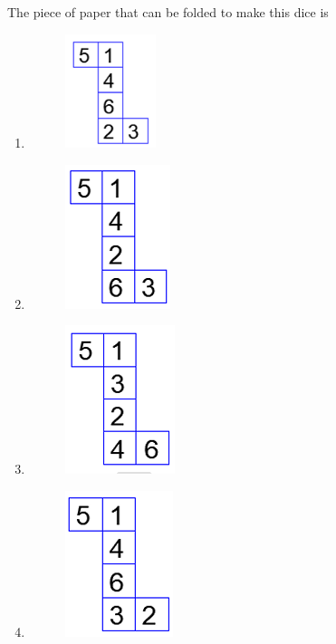 \documentclass[journal]{IEEEtran}
\begin{document}
\begin{enumerate}
The piece of paper that can be folded to make this dice is

\hfill{}
\begin{enumerate}

\item 
\begin{figure}[H]
    \centering
    \includegraphics[width=0.25\textwidth]{figs/fig4.png}
\end{figure}

\item 
\begin{figure}[H]
    \centering
    \includegraphics[width=0.25\columnwidth]{figs/fig5.png}
\end{figure}

\item 
\begin{figure}[H]
    \centering
    \includegraphics[width=0.25\columnwidth]{figs/fig6.png}
\end{figure}

\item 
\begin{figure}[H]
    \centering
    \includegraphics[width=0.25\columnwidth]{figs/fig7.png}
\end{figure}


\end{enumerate}
\end{enumerate}
\end{document}

